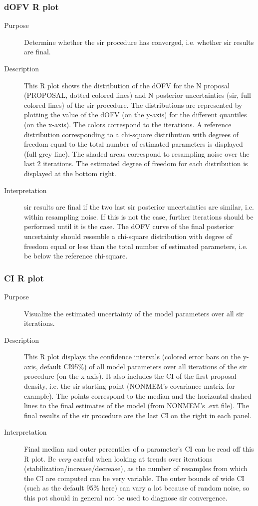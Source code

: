 \subsubsection{dOFV R plot}
\begin{description}
\item[Purpose] Determine whether the sir procedure has converged, i.e. whether sir results are final.
\item[Description] This R plot shows the distribution of the dOFV for the N proposal (PROPOSAL, dotted colored lines) and N posterior uncertainties (sir, full colored lines) of the sir procedure. The distributions are represented by plotting the value of the dOFV (on the y-axis) for the different quantiles (on the x-axis). The colors correspond to the iterations. A reference distribution corresponding to a chi-square distribution with degrees of freedom equal to the total number of estimated parameters is displayed (full grey line). The shaded areas correspond to resampling noise over the last 2 iterations. The estimated degree of freedom for each distribution is displayed at the bottom right.
\item[Interpretation] sir results are final if the two last sir posterior uncertainties are similar, i.e. within resampling noise. If this is not the case, further iterations should be performed until it is the case. The dOFV curve of the final posterior uncertainty should resemble a chi-square distribution with degree of freedom equal or less than the total number of estimated parameters, i.e. be below the reference chi-square.
\end{description}
\subsubsection{CI R plot}
\begin{description}
\item[Purpose] Visualize the estimated uncertainty of the model parameters over all sir iterations.
\item[Description] This R plot displays the confidence intervals (colored error bars on the y-axis, default CI95\%)
of all model parameters over all iterations of the sir procedure (on the x-axis). It also includes the CI of the first proposal density, i.e. the sir starting point (NONMEM’s covariance matrix for example). The points correspond to the median and the horizontal dashed lines to the final estimates of the model (from NONMEM’s .ext file). The final results of the sir procedure are the last CI on the right in each panel.
\item[Interpretation] Final median and outer percentiles of a parameter’s CI can be read off this R plot. Be \emph{very}
careful when looking at trends over iterations (stabilization/increase/decrease), as the number of resamples from which the CI are computed can be very variable. The outer bounds of wide CI (such as the default 95\% here)
can vary a lot because of random noise, so this pot should in general not be used to diagnose sir convergence.
\end{description}
